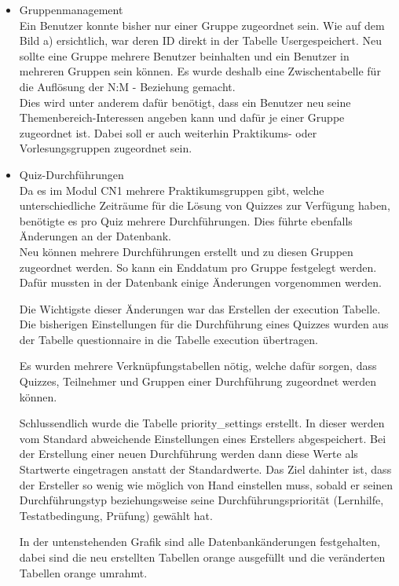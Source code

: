 \begin{itemize}
	\item Gruppenmanagement\\
	Ein Benutzer konnte bisher nur einer Gruppe zugeordnet sein. Wie auf dem Bild a) ersichtlich, war deren ID direkt in der Tabelle \glqq User\grqq gespeichert. Neu sollte eine Gruppe mehrere Benutzer beinhalten und ein Benutzer in mehreren Gruppen sein können. Es wurde deshalb eine Zwischentabelle für die Auflösung der N:M - Beziehung gemacht.\\
	Dies wird unter anderem dafür benötigt, dass ein Benutzer neu seine Themenbereich-Interessen angeben kann und dafür je einer Gruppe zugeordnet ist. Dabei soll er auch weiterhin Praktikums- oder Vorlesungsgruppen zugeordnet sein.
	\item Quiz-Durchführungen\\
	Da es im Modul \gls{CN1} mehrere Praktikumsgruppen gibt, welche unterschiedliche Zeiträume für die Lösung von Quizzes zur Verfügung haben, benötigte es pro Quiz mehrere Durchführungen. Dies führte ebenfalls Änderungen an der Datenbank. \\
	Neu können mehrere Durchführungen erstellt und zu diesen Gruppen zugeordnet werden. So kann ein Enddatum pro Gruppe festgelegt werden.
	Dafür mussten in der Datenbank einige Änderungen vorgenommen werden. 
	
	Die Wichtigste dieser Änderungen war das Erstellen der execution Tabelle. Die bisherigen Einstellungen für die Durchführung eines Quizzes wurden aus der Tabelle questionnaire in die Tabelle execution übertragen.
	
	Es wurden mehrere Verknüpfungstabellen nötig, welche dafür sorgen, dass Quizzes, Teilnehmer und Gruppen einer Durchführung zugeordnet werden können.
	
	Schlussendlich wurde die Tabelle priority\_settings erstellt. In dieser werden vom Standard abweichende Einstellungen eines Erstellers abgespeichert. Bei der Erstellung einer neuen Durchführung werden dann diese Werte als Startwerte eingetragen anstatt der Standardwerte. Das Ziel dahinter ist, dass der Ersteller so wenig wie möglich von Hand einstellen muss, sobald er seinen Durchführungstyp beziehungsweise seine Durchführungspriorität (Lernhilfe, Testatbedingung, Prüfung) gewählt hat.
	
	In der untenstehenden Grafik sind alle Datenbankänderungen festgehalten, dabei sind die neu erstellten Tabellen orange ausgefüllt und die veränderten Tabellen orange umrahmt.
	

\end{itemize}
